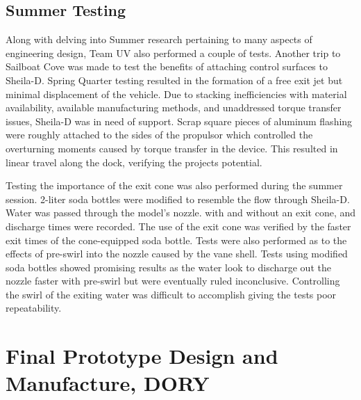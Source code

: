 \documentclass{report}
\begin{document}
\section{Summer Testing}
Along with delving into Summer research pertaining to many aspects of engineering design, Team UV also performed a couple of tests.  Another trip to Sailboat Cove was made to test the benefits of attaching control surfaces to Sheila-D.  Spring Quarter testing resulted in the formation of a free exit jet but minimal displacement of the vehicle.  Due to stacking inefficiencies with material availability, available manufacturing methods, and unaddressed torque transfer issues, Sheila-D was in need of support.  Scrap square pieces of aluminum flashing were roughly attached to the sides of the propulsor which controlled the overturning moments caused by torque transfer in the device.  This resulted in linear travel along the dock, verifying the projects potential.\par
Testing the importance of the exit cone was also performed during the summer session.  2-liter soda bottles were modified to resemble the flow through Sheila-D.  Water was passed through the model’s nozzle. with and without an exit cone, and discharge times were recorded.  The use of the exit cone was verified by the faster exit times of the cone-equipped soda bottle.  Tests were also performed as to the effects of pre-swirl into the nozzle caused by the vane shell.  Tests using modified soda bottles showed promising results as the water look to discharge out the nozzle faster with pre-swirl but were eventually ruled inconclusive.  Controlling the swirl of the exiting water was difficult to accomplish giving the tests poor repeatability.\\
\chapter{Final Prototype Design and Manufacture, DORY}
\end{document}
